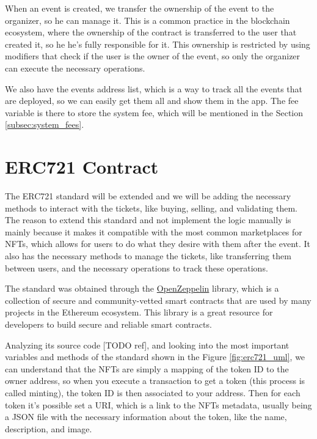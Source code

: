 When an event is created, we transfer the ownership of the event to the
organizer, so he can manage it. This is a common practice in the blockchain
ecosystem, where the ownership of the contract is transferred to the user that
created it, so he he's fully responsible for it. This ownership is restricted
by using modifiers that check if the user is the owner of the event, so only
the organizer can execute the necessary operations.

We also have the events address list, which is a way to track all the events
that are deployed, so we can easily get them all and show them in the app. The
fee variable is there to store the system fee, which will be mentioned in the
Section \ref{subsec:system_fees}.

\section{ERC721 Contract}
\label{sec:erc721_contract}

The ERC721 standard will be extended and we will be adding the necessary
methods to interact with the tickets, like buying, selling, and validating
them. The reason to extend this standard and not implement the logic manually
is mainly because it makes it compatible with the most common marketplaces for
NFTs, which allows for users to do what they desire with them after the event.
It also has the necessary methods to manage the tickets, like transferring them
between users, and the necessary operations to track these operations.

The standard was obtained through the
\href{https://docs.openzeppelin.com/contracts/api/token/erc721#ERC721}{OpenZeppelin}
library, which is a collection of secure and community-vetted smart contracts
that are used by many projects in the Ethereum ecosystem. This library is a
great resource for developers to build secure and reliable smart contracts.

Analyzing its source code [TODO ref], and looking into the most important
variables and methods of the standard shown in the Figure \ref{fig:erc721_uml},
we can understand that the NFTs are simply a mapping of the token ID to the
owner address, so when you execute a transaction to get a token (this process
is called minting), the token ID is then associated to your address. Then for
each token it's possible set a URI, which is a link to the NFTs metadata,
usually being a JSON file with the necessary information about the token, like
the name, description, and image.

